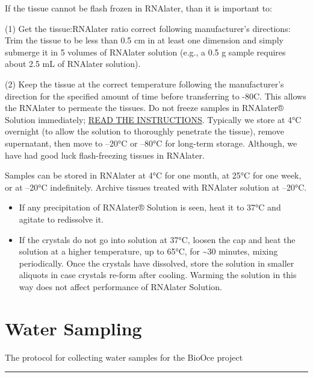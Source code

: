 \documentclass[
  letterpaper,
  DIV=11,
  numbers=noendperiod]{scrreprt}
\begin{document}
If the tissue cannot be flash frozen in RNAlater, than it is important
to:

(1) Get the tissue:RNAlater ratio correct following manufacturer's
directions: Trim the tissue to be less than 0.5 cm in at least one
dimension and simply submerge it in 5 volumes of RNAlater solution
(e.g., a 0.5 g sample requires about 2.5 mL of RNAlater solution).

(2) Keep the tissue at the correct temperature following the
manufacturer's direction for the specified amount of time before
transferring to -80C. This allows the RNAlater to permeate the tissues.
Do not freeze samples in RNAlater® Solution immediately;
\href{https://www.thermofisher.com/content/dam/LifeTech/migration/en/filelibrary/nucleic-acid-purification-analysis/pdfs.par.18819.file.dat/bp-7020.pdf}{READ
THE INSTRUCTIONS}. Typically we store at 4°C overnight (to allow the
solution to thoroughly penetrate the tissue), remove supernatant, then
move to --20°C or --80°C for long-term storage. Although, we have had
good luck flash-freezing tissues in RNAlater.

Samples can be stored in RNAlater at 4°C for one month, at 25°C for one
week, or at --20°C indefinitely. Archive tissues treated with RNAlater
solution at --20°C.

\begin{itemize}
\item
  If any precipitation of RNAlater® Solution is seen, heat it to 37°C
  and agitate to redissolve it.
\item
  If the crystals do not go into solution at 37°C, loosen the cap and
  heat the solution at a higher temperature, up to 65°C, for
  \textasciitilde30 minutes, mixing periodically. Once the crystals have
  dissolved, store the solution in smaller aliquots in case crystals
  re-form after cooling. Warming the solution in this way does not
  affect performance of RNAlater Solution.
\end{itemize}

\hypertarget{water-sampling}{%
\chapter{Water Sampling}\label{water-sampling}}

The protocol for collecting water samples for the BioOce project

\begin{center}\rule{0.5\linewidth}{0.5pt}\end{center}
\end{document}
